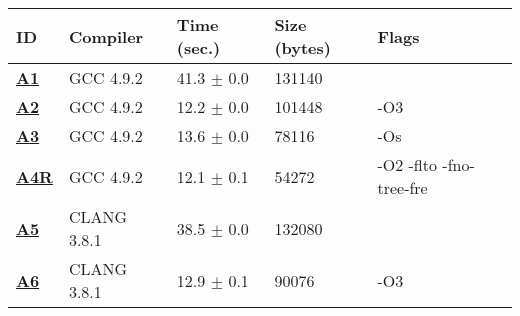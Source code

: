     \begin{tabular}{|l|l|l|l|p{3.2in}|}
     \hline
      \textbf{ID} & \textbf{Compiler} & \textbf{Time (sec.)} & \textbf{Size (bytes)} & \textbf{Flags} \\ 
     \hline
      \textbf{ \href{http://cknowledge.org/repo/web.php?wcid=experiment:07969231dd8f9474\&subpoint=cfcb9327f42ddabd}{A1} } &  GCC 4.9.2  &  41.3 $\pm$ 0.0  &  131140  & {\small  }\\
     \hline
      \textbf{ \href{http://cknowledge.org/repo/web.php?wcid=experiment:9b2b24a80c45aa9b\&subpoint=eb28149e9a71762d}{A2} } &  GCC 4.9.2  &  12.2 $\pm$ 0.0  &  101448  & {\small -O3 }\\
     \hline
      \textbf{ \href{http://cknowledge.org/repo/web.php?wcid=experiment:9195c9fa4d5d89af\&subpoint=2432890269556b39}{A3} } &  GCC 4.9.2  &  13.6 $\pm$ 0.0  &  78116  & {\small -Os }\\
     \hline
      \textbf{ \href{http://cknowledge.org/repo/web.php?wcid=experiment:f5489592a3a15bf3\&subpoint=6236b2e4742629aa}{A4R} } &  GCC 4.9.2  &  12.1 $\pm$ 0.1  &  54272  & {\small -O2 -flto -fno-tree-fre }\\
     \hline
      \textbf{ \href{http://cknowledge.org/repo/web.php?wcid=experiment:eca2f4aa2a3ab852\&subpoint=a624bb4c10a1619f}{A5} } &  CLANG 3.8.1  &  38.5 $\pm$ 0.0  &  132080  & {\small  }\\
     \hline
      \textbf{ \href{http://cknowledge.org/repo/web.php?wcid=experiment:777b58443e536152\&subpoint=e13b1e85e3e0c5d6}{A6} } &  CLANG 3.8.1  &  12.9 $\pm$ 0.1  &  90076  & {\small -O3 }\\
     \hline
    \end{tabular}    